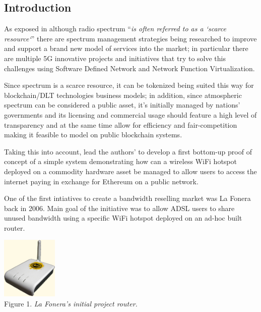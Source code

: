 \documentclass[12pt]{amsart}
\begin{document}
\setlength{\columnsep}{20pt}
\begin{multicols}{2}
\section{Introduction}\label{sec:introduction}

\vspace{0.35cm}
As exposed in \cite{spectrumnh} although radio spectrum
``\textit{is often
  referred to as a `scarce resource`}'' there are
spectrum management strategies
being researched to improve and
support a brand new model of services
into the market; in particular there are
multiple 5G\cite{5g} innovative projects and initiatives
that try to solve this challenges using Software
Defined Network\cite{sdns}
and Network Function Virtualization\cite{nfv}.

\vspace{0.35cm}

Since spectrum is a scarce resource, it can
be tokenized being suited this
way for blockchain/DLT technologies business models;
in addition, since
atmospheric spectrum can be considered a public
asset, it's initially managed by nations' governments
and its licensing and commercial usage should feature
a high level of transparency and at the same time
allow for efficiency and fair-competition making it
feasible to model on public blockchain systems.

\vspace{0.35cm}

Taking this into account, lead the authors' to develop
a first bottom-up proof of concept of a simple system
demonstrating how can a wireless WiFi hotspot
deployed on a commodity hardware asset\cite{RaspberryPi19}
be managed to allow users to access the internet
paying in exchange for Ethereum on a public network.

\vspace{0.35cm}

One of the first intiatives to create
a bandwidth reselling market was La Fonera\cite{fon}
back in 2006. Main goal of the initiative was
to allow ADSL users to share unused bandwidth using
a specific WiFi hotspot deployed on an ad-hoc
built router.

\begin{center}
  \includegraphics[keepaspectratio, width=0.2\textwidth]{images/lafonera-sourcewikipedia.eps}
  \\
  Figure 1. \textit{La Fonera's initial project router.}
\end{center}


\end{multicols}
\end{document}
